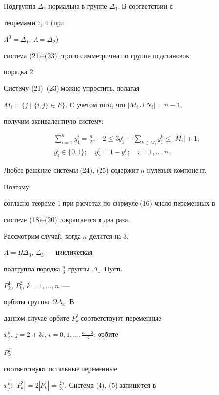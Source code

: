 Подгруппа $\Delta_2$ нормальна в группе $\Delta_1$. В соответствии с


теоремами 3, 4 (при


$\Lambda^0=\Delta_1$, $\Lambda=\Delta_2$)


система (21)--(23) строго симметрична по группе подстановок


порядка 2.





Систему (21)--(23) можно упростить, полагая


$M_i=\{j\mid\{i,j\}\in E\}$. С учетом того, что $|M_i\cup N_i|=n-1$,


получим эквивалентную систему:


\begin{gather}


\sum^n_{i=1}y^i_1=\frac{n}{2};\quad 2\le 3y^i_1+


\sum_{k\in M_i}y^k_1\le|M_i|+1;\\


y^i_1\in\{0,1\};\quad y^i_2=1-y^i_1;\quad


i=1,\dotsc,n.


\end{gather}


Любое решение системы (24), (25) содержит $n$ нулевых компонент.


Поэтому


согласно теореме 1 при расчетах по формуле (16) число переменных в


системе (18)--(20) сокращается в два раза.





Рассмотрим случай, когда $n$ делится на 3,


$\Lambda=\Omega\Delta_3$, $\Delta_3$ --- циклическая


подгруппа порядка $\frac{n}{3}$ группы $\Delta_1$. Пусть


$P^1_k$, $P^2_k$, $k=1,\dotsc,n$, ---


орбиты группы $\Omega\Delta_3$. В


данном случае орбите $P^1_k$ соответствуют переменные


$x^k_j$, $j=2+3i$, $i=0,1,\dotsc,\frac{n-3}{3}$; орбите


$P^2_k$


соответствуют остальные переменные


$x^k_j$; $|P^2_k|=2|P^1_k|=\frac{2n}{3}$. Система (4), (5) запишется в


